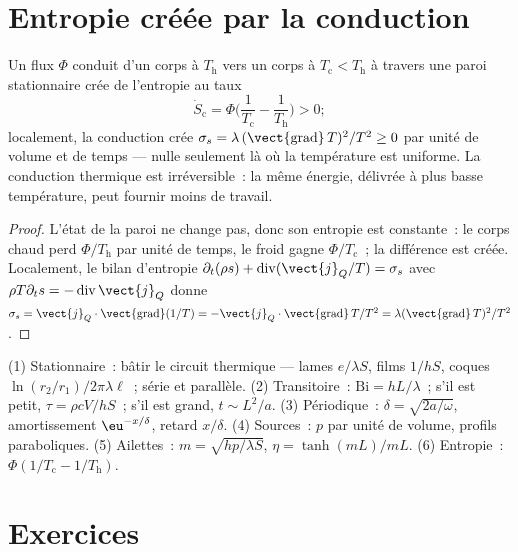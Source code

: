 \section{Entropie créée par la conduction}

\begin{proposition}\label{prop:b2:heat-conduction:entropy}
Un flux $\Phi$ conduit d'un corps à $T_{\text{h}}$ vers un corps à
$T_{\text{c}} < T_{\text{h}}$ à travers une paroi stationnaire crée de l'entropie au
taux
\[
\dot S_{\text{c}} = \Phi\Big(\frac{1}{T_{\text{c}}} - \frac{1}{T_{\text{h}}}\Big) > 0 ;
\]
localement, la conduction crée $\sigma_s = \lambda\,(\vect{\operatorname{grad}}\,T)^2/T^2
\ge 0$ par unité de volume et de temps --- nulle seulement là où la température est
uniforme. La conduction thermique est irréversible~: la même énergie, délivrée à
plus basse température, peut fournir moins de travail.
\end{proposition}

\begin{proof}
L'état de la paroi ne change pas, donc son entropie est constante~: le corps
chaud perd $\Phi/T_{\text{h}}$ par unité de temps, le froid gagne
$\Phi/T_{\text{c}}$~; la différence est créée. Localement, le bilan d'entropie
$\partial_t(\rho s) + \operatorname{div}(\vect{j}_Q/T) = \sigma_s$
avec $\rho T\partial_t s = -\operatorname{div}\vect{j}_Q$ donne $\sigma_s =
\vect{j}_Q\cdot\vect{\operatorname{grad}}(1/T) = -\vect{j}_Q\cdot
\vect{\operatorname{grad}}\,T/T^2 = \lambda(\vect{\operatorname{grad}}\,T)^2/T^2$.
\end{proof}

\begin{method}\label{meth:b2:heat-conduction:method}
(1) Stationnaire~: bâtir le circuit thermique --- lames $e/\lambda S$, films
$1/hS$, coques $\ln(r_2/r_1)/2\pi\lambda\ell$~; série et parallèle.
(2) Transitoire~: $\mathrm{Bi} = hL/\lambda$~; s'il est petit, $\tau = \rho cV/hS$~; s'il est
grand, $t \sim L^2/a$. (3) Périodique~: $\delta = \sqrt{2a/\omega}$, amortissement
$\eu^{-x/\delta}$, retard $x/\delta$. (4) Sources~: $p$ par unité de volume, profils
paraboliques. (5) Ailettes~: $m = \sqrt{hp/\lambda S}$, $\eta = \tanh(mL)/mL$. (6)
Entropie~: $\Phi(1/T_{\text{c}} - 1/T_{\text{h}})$.
\end{method}

\section{Exercices}

